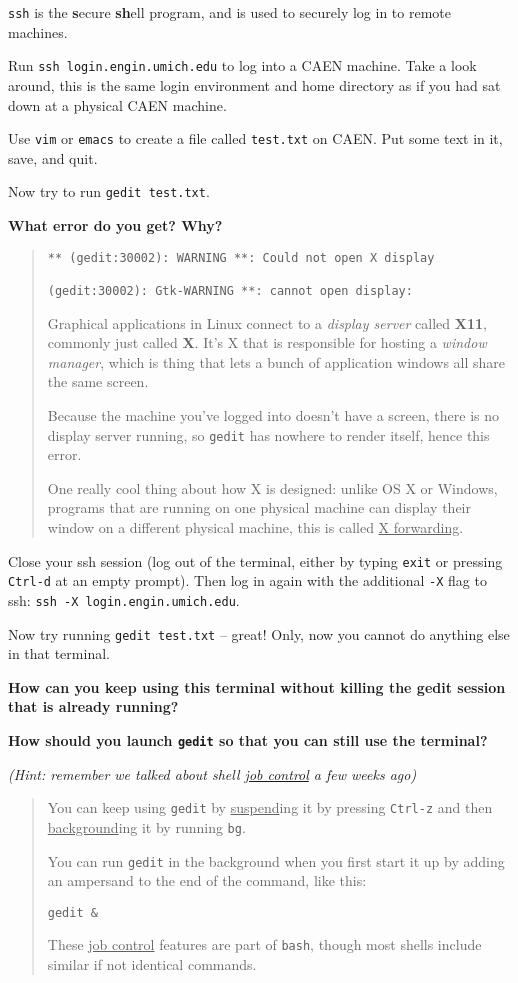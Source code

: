 \documentclass{article}
\begin{document}
\texttt{ssh} is the \textbf{s}ecure \textbf{sh}ell program, and is used to
securely log in to remote machines.

Run \texttt{ssh login.engin.umich.edu} to log into a CAEN machine. Take a look
around, this is the same login environment and home directory as if you had
sat down at a physical CAEN machine.

Use \texttt{vim} or \texttt{emacs} to create a file called \texttt{test.txt}
on CAEN. Put some text in it, save, and quit.

Now try to run \texttt{gedit~test.txt}.

\textbf{What error do you get? Why?}
\begin{quote}
  \color{violet}
  \begin{lstlisting}
** (gedit:30002): WARNING **: Could not open X display

(gedit:30002): Gtk-WARNING **: cannot open display:
  \end{lstlisting}
  Graphical applications in Linux connect to a \emph{display server} called
  \textbf{X11}, commonly just called \textbf{X}. It's X that is responsible
  for hosting a \emph{window manager}, which is thing that lets a bunch of
  application windows all share the same screen.

  Because the machine you've logged into doesn't have a screen, there is no
  display server running, so \texttt{gedit} has nowhere to render itself,
  hence this error.

  One really cool thing about how X is designed: unlike OS X or Windows,
  programs that are running on one physical machine can display their window
  on a different physical machine, this is called \ul{X forwarding}.
\end{quote}


Close your ssh session (log out of the terminal, either by typing
\texttt{exit} or pressing \texttt{Ctrl-d} at an empty prompt). Then log in
again with the additional \texttt{-X} flag to ssh:
\texttt{ssh~-X~login.engin.umich.edu}.

Now try running \texttt{gedit test.txt} -- great! Only, now you cannot do
anything else in that terminal.

\textbf{How can you keep using this terminal without killing the gedit session
  that is already running?}

\textbf{How should you launch \texttt{gedit} so that you can still use the
  terminal?}

\emph{\small (Hint: remember we talked about shell \ul{job control} a few
  weeks ago)}
\begin{quote}
  \color{violet}
  You can keep using \texttt{gedit} by \ul{suspend}ing it by pressing
  \texttt{Ctrl-z} and then \ul{background}ing it by running \texttt{bg}.

  You can run \texttt{gedit} in the background when you first start it up by
  adding an ampersand to the end of the command, like this:

  \texttt{gedit \&}

  These \ul{job control} features are part of \texttt{bash}, though most
  shells include similar if not identical commands.
\end{quote}
\end{document}
